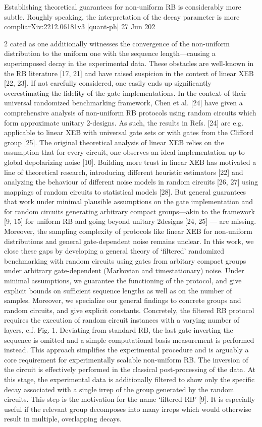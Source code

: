 Establishing theoretical guarantees for non-uniform RB is considerably more subtle. Roughly speaking, the interpretation of the decay parameter is more compliarXiv:2212.06181v3 [quant-ph] 27 Jun 202

2 cated as one additionally witnesses the convergence of the non-uniform distribution to the uniform one with the sequence length—causing a superimposed decay in the experimental data. These obstacles are well-known in the RB literature [17, 21] and have raised suspicion in the context of linear XEB [22, 23]. If not carefully considered, one easily ends up significantly overestimating the fidelity of the gate implementations. In the context of their universal randomized benchmarking framework, Chen et al. [24] have given a comprehensive analysis of non-uniform RB protocols using random circuits which form approximate unitary 2-designs. As such, the results in Refs. [24] are e.g. applicable to linear XEB with universal gate sets or with gates from the Clifford group [25]. The original theoretical analysis of linear XEB relies on the assumption that for every circuit, one observes an ideal implementation up to global depolarizing noise [10]. Building more trust in linear XEB has motivated a line of theoretical research, introducing different heuristic estimators [22] and analyzing the behaviour of different noise models in random circuits [26, 27] using mappings of random circuits to statistical models [28]. But general guarantees that work under minimal plausible assumptions on the gate implementation and for random circuits generating arbitrary compact groups—akin to the framework [9, 15] for uniform RB and going beyond unitary 2designs [24, 25] — are missing. Moreover, the sampling complexity of protocols like linear XEB for non-uniform distributions and general gate-dependent noise remains unclear. In this work, we close these gaps by developing a general theory of ‘filtered’ randomized benchmarking with random circuits using gates from arbitary compact groups under arbitrary gate-dependent (Markovian and timestationary) noise. Under minimal assumptions, we guarantee the functioning of the protocol, and give explicit bounds on sufficient sequence lengths as well as on the number of samples. Moreover, we specialize our general findings to concrete groups and random circuits, and give explicit constants. Concretely, the filtered RB protocol requires the execution of random circuit instances with a varying number of layers, c.f. Fig. 1. Deviating from standard RB, the last gate inverting the sequence is omitted and a simple computational basis measurement is performed instead. This approach simplifies the experimental procedure and is arguably a core requirement for experimentally scalable non-uniform RB. The inversion of the circuit is effectively performed in the classical post-processing of the data. At this stage, the experimental data is additionally filtered to show only the specific decay associated with a single irrep of the group generated by the random circuits. This step is the motivation for the name ‘filtered RB’ [9]. It is especially useful if the relevant group decomposes into many irreps which would otherwise result in multiple, overlapping decays.

